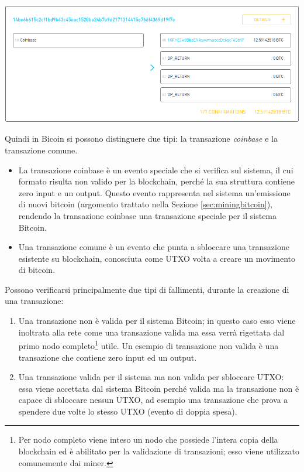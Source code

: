{\centering
\vspace{15pt}
\includegraphics[scale=0.35]{images/example_coinbase_vincent.png}
\vspace{10pt}
\par}


Quindi in Bicoin si possono distinguere due tipi: la transazione {\it coinbase\/} e la transazione comune.
\begin{itemize}
  \item La transazione coinbase è un evento speciale che si verifica sul sistema, il cui formato risulta non valido per la blockchain, perché la sua struttura contiene zero input e un output. Questo evento rappresenta nel sistema un’emissione di nuovi bitcoin (argomento trattato nella Sezione \ref{sec:miningbitcoin}), rendendo la transazione coinbase una transazione speciale per il sistema Bitcoin.
  \item Una transazione comune è un evento che punta a sbloccare una transazione esistente su blockchain, conosciuta come UTXO volta a creare un movimento di bitcoin.
\end{itemize}

Possono verificarsi principalmente due tipi di fallimenti, durante la creazione di una transazione:
\begin{enumerate}
  \item Una transazione non è valida per il sistema Bitcoin; in questo caso esso viene inoltrata alla rete come una transazione valida ma essa verrà rigettata dal primo nodo completo\footnote{Per nodo completo viene inteso un nodo che possiede l’intera copia della blockchain ed è abilitato per la validazione di transazioni; esso viene utilizzato comunemente dai miner.} utile. Un esempio di transazione non valida è una transazione che contiene zero input ed un output.
  \item Una transazione valida per il sistema ma non valida per sbloccare UTXO: essa viene accettata dal sistema Bitcoin perché valida ma la transazione non è capace di sbloccare nessun UTXO, ad esempio una transazione che prova a spendere due volte lo stesso UTXO (evento di doppia spesa).
\end{enumerate}

